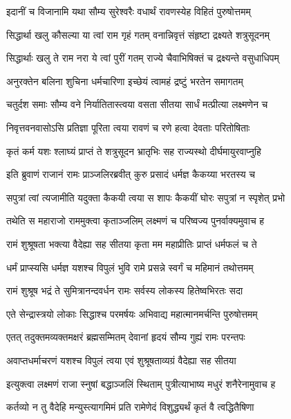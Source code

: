 \twolineshloka
{इदानीं च विजानामि यथा सौम्य सुरेश्वरैः}
{वधार्थं रावणस्येह विहितं पुरुषोत्तमम्} %

\twolineshloka
{सिद्धार्था खलु कौसल्या या त्वां राम गृहं गतम्}
{वनान्निवृत्तं संहृष्टा द्रक्ष्यते शत्रुसूदनम्} %

\twolineshloka
{सिद्धार्थाः खलु ते राम नरा ये त्वां पुरीं गतम्}
{राज्ये चैवाभिषिक्तं च द्रक्ष्यन्ते वसुधाधिपम्} %

\twolineshloka
{अनुरक्तेन बलिना शुचिना धर्मचारिणा}
{इच्छेयं त्वामहं द्रष्टुं भरतेन समागतम्} %

\twolineshloka
{चतुर्दश समाः सौम्य वने निर्यातितास्त्वया}
{वसता सीतया सार्धं मत्प्रीत्या लक्ष्मणेन च} %

\twolineshloka
{निवृत्तवनवासोऽसि प्रतिज्ञा पूरिता त्वया}
{रावणं च रणे हत्वा देवताः परितोषिताः} %

\twolineshloka
{कृतं कर्म यशः श्लाघ्यं प्राप्तं ते शत्रुसूदन}
{भ्रातृभिः सह राज्यस्थो दीर्घमायुरवाप्नुहि} %

\twolineshloka
{इति ब्रुवाणं राजानं रामः प्राञ्जलिरब्रवीत्}
{कुरु प्रसादं धर्मज्ञ कैकय्या भरतस्य च} %

\twolineshloka
{सपुत्रां त्वां त्यजामीति यदुक्ता कैकयी त्वया}
{स शापः कैकयीं घोरः सपुत्रां न स्पृशेत् प्रभो} %

\twolineshloka
{तथेति स महाराजो राममुक्त्वा कृताञ्जलिम्}
{लक्ष्मणं च परिष्वज्य पुनर्वाक्यमुवाच ह} %

\twolineshloka
{रामं शुश्रूषता भक्त्या वैदेह्या सह सीतया}
{कृता मम महाप्रीतिः प्राप्तं धर्मफलं च ते} %

\twolineshloka
{धर्मं प्राप्स्यसि धर्मज्ञ यशश्च विपुलं भुवि}
{रामे प्रसन्ने स्वर्गं च महिमानं तथोत्तमम्} %

\twolineshloka
{रामं शुश्रूष भद्रं ते सुमित्रानन्दवर्धन}
{रामः सर्वस्य लोकस्य हितेष्वभिरतः सदा} %

\twolineshloka
{एते सेन्द्रास्त्रयो लोकाः सिद्धाश्च परमर्षयः}
{अभिवाद्य महात्मानमर्चन्ति पुरुषोत्तमम्} %

\twolineshloka
{एतत् तदुक्तमव्यक्तमक्षरं ब्रह्मसम्मितम्}
{देवानां हृदयं सौम्य गुह्यं रामः परन्तपः} %

\twolineshloka
{अवाप्तधर्माचरणं यशश्च विपुलं त्वया}
{एवं शुश्रूषताव्यग्रं वैदेह्या सह सीतया} %

\twolineshloka
{इत्युक्त्वा लक्ष्मणं राजा स्नुषां बद्धाञ्जलिं स्थिताम्}
{पुत्रीत्याभाष्य मधुरं शनैरेनामुवाच ह} %

\twolineshloka
{कर्तव्यो न तु वैदेहि मन्युस्त्यागमिमं प्रति}
{रामेणेदं विशुद्ध्यर्थं कृतं वै त्वद्धितैषिणा} %

